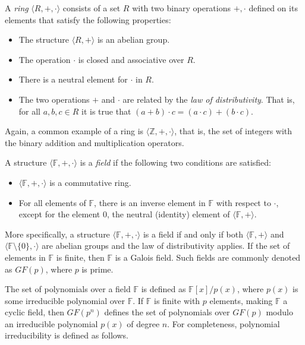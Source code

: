 \begin{definition}
A \emph{ring} $\langle R, +, \cdot \rangle$ consists of a set $R$ with two binary operations $+, \cdot$ defined on its elements that satisfy the following properties:
\begin{itemize}
	\item The structure $\langle R, + \rangle$ is an abelian group.
	\item The operation $\cdot$ is closed and associative over $R$. 
	\item There is a neutral element for $\cdot$ in $R$. 
	\item The two operations $+$ and $\cdot$ are related by the \emph{law of distributivity}. That is, for all $a, b, c \in R$ it is true that $(a + b) \cdot c = (a \cdot c) + (b \cdot c)$.
\end{itemize}
\end{definition}

Again, a common example of a ring is $\langle \mathbb{Z}, +, \cdot \rangle$, that is, the set of integers with the binary addition and multiplication operators.

\begin{definition}
A structure $\langle \mathbb{F}, +, \cdot \rangle$ is a \emph{field} if the following two conditions are satisfied:
\begin{itemize}
	\item $\langle \mathbb{F}, +, \cdot \rangle$ is a commutative ring.
	\item For all elements of $\mathbb{F}$, there is an inverse element in $\mathbb{F}$ with respect to $\cdot$, except for the element $0$, the neutral (identity) element of $\langle \mathbb{F}, + \rangle$. 
\end{itemize}
\end{definition}

More specifically, a structure $\langle \mathbb{F}, +, \cdot \rangle$ is a field if and only if both $\langle \mathbb{F}, + \rangle$ and $\langle \mathbb{F} \setminus \{0\}, \cdot \rangle$ are abelian groups and the law of distributivity applies. If the set of elements in $\mathbb{F}$ is finite, then $\mathbb{F}$ is a Galois field. Such fields are commonly denoted as $GF(p)$, where $p$ is prime.

The set of polynomials over a field $\mathbb{F}$ is defined as $\mathbb{F}[x]/p(x)$, where $p(x)$ is some irreducible polynomial over $\mathbb{F}$. If $\mathbb{F}$ is finite with $p$ elements, making $\mathbb{F}$ a cyclic field, then $GF(p^n)$ defines the set of polynomials over $GF(p)$ modulo an irreducible polynomial $p(x)$ of degree $n$. For completeness, polynomial irreducibility is defined as follows.

